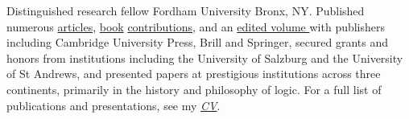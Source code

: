 {Distinguished research fellow}
{Fordham University}
{Bronx, NY. Published numerous \href{https://fordham.academia.edu/jacobarchambault}{articles}, \href{https://www.collegepublications.co.uk/dialogues/?00005}{book} \href{https://www.cambridgescholars.com/hylomorphism-and-mereology}{contributions}, and an \href{https://brill.com/view/journals/viv/56/3-4/viv.56.issue-3-4.xml?language=en}{edited volume }
	with publishers including Cambridge University Press, Brill and Springer, 
	secured grants and honors from institutions including the University of Salzburg and the University of St Andrews,
	and presented papers at prestigious institutions across three continents, 
	primarily in the history and philosophy of logic. 
	For a full list of publications and presentations, see my 
	\href{https://github.com/JacobArchambault/Academic-Papers/blob/master/Professional\%20Documents/resume/cv.pdf}{\emph{CV}}.}
